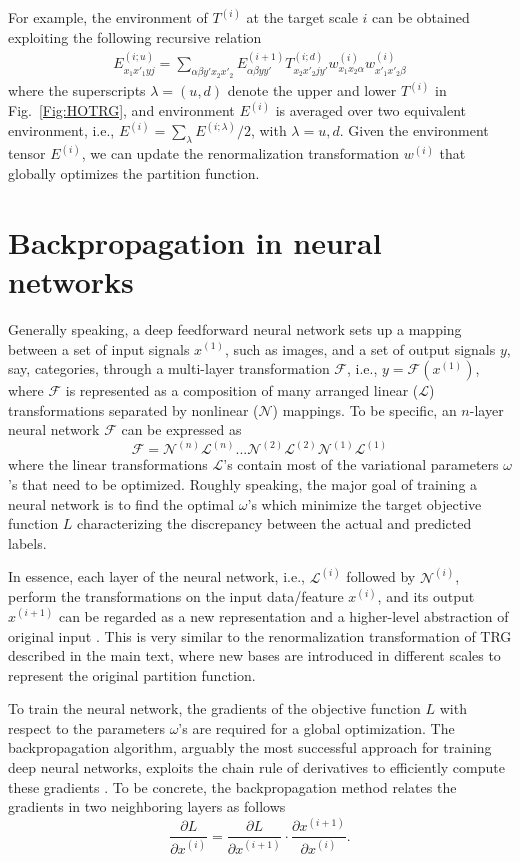 \documentclass[aps,prx,twocolumn,showpacs,psfig,superscriptaddress,longbibliography]{revtex4-1}
\def\lsb#1{\left(#1\right)}              %
\def\beqn{\begin{eqnarray}}
\def\eeqn{\end{eqnarray}}
\def\beq{\begin{equation}}
\def\eeq{\end{equation}}
\def\pd#1#2{\frac{\partial{#1}}{\partial{#2}}}
\begin{document}
For example, the environment of $T^{(i)}$ at the target scale $i$ can be obtained exploiting the following recursive relation
\beqn
E^{(i;u)}_{x_1x'_1yj} = \sum_{\alpha\beta y'x_2x'_2}E^{(i+1)}_{\alpha\beta yy'}T^{(i;d)}_{x_2x'_2jy'}w^{(i)}_{x_1x_2\alpha}w^{(i)}_{x'_1x'_2\beta} \label{SRG}
\eeqn
where the superscripts $\lambda = \lsb{u,d}$ denote the upper and lower $T^{(i)}$ in Fig.~\ref{Fig:HOTRG}, and environment $E^{(i)}$ is averaged over two equivalent environment, i.e., $E^{(i)} = \sum_{\lambda}E^{(i;\lambda)} / 2$, with $\lambda=u,d$. 
Given the environment tensor $E^{(i)}$, we can update the renormalization transformation $w^{(i)}$ that globally optimizes the partition function.

\section{Backpropagation in neural networks}
\label{App:Backprop}
Generally speaking, a deep feedforward neural network sets up a mapping between
a set of input signals $x^{(1)}$, such as images, and a set of output signals $y$, say, categories, through a multi-layer transformation $\mathcal{F}$, i.e., $y = \mathcal{F}(x^{(1)})$, where $\mathcal{F}$ is represented as a composition of many arranged linear ($\mathcal{L}$) transformations separated by nonlinear ($\mathcal{N}$) mappings. To be specific,
an $n$-layer neural network $\mathcal{F}$ can be expressed as
\beq
\mathcal{F} = \mathcal{N}^{(n)}\mathcal{L}^{(n)}...\mathcal{N}^{(2)}\mathcal{L}^{(2)}\mathcal{N}^{(1)}\mathcal{L}^{(1)}
\eeq
where the linear transformations $\mathcal{L}$'s contain most of the variational parameters $\omega$'s that need to be optimized. Roughly speaking, the major goal of training a neural network is to find the optimal $\omega$'s which minimize the target objective function $L$ characterizing the discrepancy between the actual and predicted labels. 

In essence, each layer of the neural network, i.e., $\mathcal{L}^{(i)}$ followed by $\mathcal{N}^{(i)}$, perform the transformations on the input data/feature $x^{(i)}$, and its output $x^{(i+1)}$ can be regarded as a new representation and a higher-level abstraction of original input \cite{SHLi2018,Koch-Janusz2018}. This is very similar to the renormalization transformation of TRG described in the main text, where new bases are introduced in different scales to represent the original partition function.

To train the neural network, the gradients of the objective function $L$ with respect to the parameters $\omega$'s are required for a global optimization. The backpropagation algorithm, arguably the most successful approach for training deep neural networks, exploits the chain rule of derivatives to efficiently compute these gradients \cite{Hinton-Nature1986, Parker-LLR1985, LeCun-IEEE1989,LeCun-Nature2015}. To be concrete, the backpropagation method relates the gradients in two neighboring layers as follows
\beq
\pd{L}{x^{(i)}} = \pd{L}{x^{(i+1)}}\cdot\pd{x^{(i+1)}}{x^{(i)}}.  \label{BP}
\eeq
\end{document}
